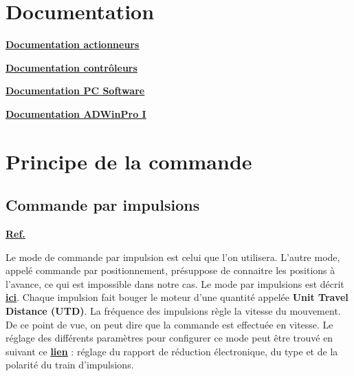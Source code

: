 \documentclass[a4paper,11pt]{beamer}
\begin{document}
\section{Documentation}
\begin{frame}
\centering
	\textcolor{blue}{\textbf{\underline{\href{https://raw.githubusercontent.com/fbuloup/Interface_IAI/main/Documentation/RCS4-SLIDER(ME3769-1H).pdf}{Documentation actionneurs}}}}	
	
	\textcolor{blue}{\textbf{\underline{\href{https://raw.githubusercontent.com/fbuloup/Interface_IAI/main/Documentation/SCON-CB_CGB(ME0340-8A).pdf}{Documentation contrôleurs}}}}

	\textcolor{blue}{\textbf{\underline{\href{https://raw.githubusercontent.com/fbuloup/Interface_IAI/main/Documentation/RCM-101-MW_USB(ME0155-31A).pdf}{Documentation PC Software}}}}	
\vspace{1cm}
  
 \textcolor{blue}{\textbf{\underline{\href{https://raw.githubusercontent.com/fbuloup/Interface_IAI/main/Documentation/ProI-HW_eng.pdf}{Documentation ADWinPro I}}}}	
\end{frame}

\section{Principe de la commande}
\subsection{Commande par impulsions}
\begin{frame}
\centering
\textcolor{blue}{\textbf{\underline{\href{https://raw.githubusercontent.com/fbuloup/Interface_IAI/main/Documentation/SCON-CB_CGB(ME0340-8A).pdf\#page=242}{Ref.}}}}
\vspace{0.5cm}

\justifying
Le mode de commande par impulsion est celui que l'on utilisera. L'autre mode, appelé commande par positionnement, présuppose de connaitre les positions à l'avance, ce qui est impossible dans notre cas. Le mode par impulsions est décrit
	\textcolor{blue}{\textbf{\underline{\href{https://raw.githubusercontent.com/fbuloup/Interface_IAI/main/Documentation/SCON-CB_CGB(ME0340-8A).pdf\#page=253}{ici}}}}. Chaque impulsion fait bouger le moteur d'une quantité appelée \textbf{Unit Travel Distance (UTD)}. La fréquence des impulsions règle la vitesse du mouvement. De ce point de vue, on peut dire que la commande est effectuée en vitesse.
Le réglage des différents paramètres pour configurer ce mode peut être trouvé en suivant ce 
\textcolor{blue}{\textbf{\underline{\href{https://raw.githubusercontent.com/fbuloup/Interface_IAI/main/Documentation/SCON-CB_CGB(ME0340-8A).pdf\#page=257}{lien}}}} : réglage du rapport de réduction électronique, du type et de la polarité du train d'impulsions.
\end{frame}
\end{document}
